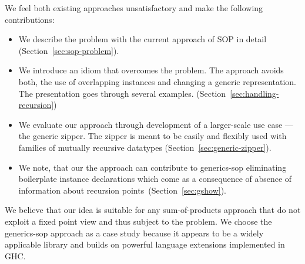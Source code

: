 \documentclass[runningheads]{llncs}
\begin{document}
We feel both existing approaches unsatisfactory and make the following contributions:
\begin{itemize}
\item We describe the problem with the current approach of SOP in detail (Section~\ref{sec:sop-problem}).
\item We introduce an idiom that overcomes the problem. The approach avoids both, the use of overlapping instances and changing a generic representation. The presentation goes through several examples. (Section~\ref{sec:handling-recursion})
\item We evaluate our approach through development of a larger-scale use case — the generic zipper. The zipper is meant to be easily and flexibly used with families of mutually recursive datatypes (Section~\ref{sec:generic-zipper}).
\item We note, that our the approach can contribute to \textsf{generics-sop} eliminating boilerplate instance declarations which come as a consequence of absence of information about recursion points~(Section~\ref{sec:gshow}).
\end{itemize}

We believe that our idea is suitable for any sum-of-products approach that do not exploit a fixed point view and thus subject to the problem. We choose the \textsf{generics-sop} approach as a case study because it appears to be a widely applicable library and builds on powerful language extensions implemented in GHC.


%
\end{document}
